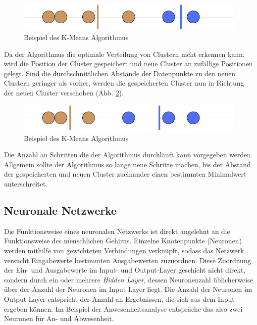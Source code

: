 \begin{figure}[h]
    \centering
    \includegraphics[width=12.0cm]{pic/KMeans_step1.png}
    \caption{Beispiel des K-Means Algorithmus}
    \label{fig:KMeans1}
\end{figure}

Da der Algorithmus die optimale Verteilung von Clustern nicht erkennen kann, wird die Position der Cluster 
gespeichert und neue Cluster an zufällige Positionen gelegt. Sind die durchschnittlichen Abstände der Datenpunkte
zu den neuen Clustern geringer als vorher, werden die gespeicherten Cluster nun in Richtung der neuen Cluster 
verschoben (Abb. \ref{fig:KMeans2}).\\

\begin{figure}[h]
    \centering
    \includegraphics[width=12.0cm]{pic/KMeans_step2.png}
    \caption{Beispiel des K-Means Algorithmus}
    \label{fig:KMeans2}
\end{figure}

Die Anzahl an Schritten die der Algorithmus durchläuft kann vorgegeben werden. Allgemein sollte der Algorithmus
so lange neue Schritte machen, bis der Abstand der gespeicherten und neuen Cluster zueinander einen bestimmten
Minimalwert unterschreitet.

\newpage
\subsection{Neuronale Netzwerke}
Die Funktionsweise eines neuronalen Netzwerks ist direkt angelehnt an die Funktionsweise des menschlichen Gehirns.
Einzelne Knotenpunkte (Neuronen) werden mithilfe von gewichteten Verbindungen verknüpft, sodass das Netzwerk versucht 
Eingabewerte bestimmten Ausgabewerten zuzuordnen. Diese Zuordnung der Ein- und Ausgabewerte im Input- und Output-Layer 
geschieht nicht direkt, sondern durch ein oder mehrere \textit{Hidden Layer}, dessen Neuronenzahl üblicherweise über 
der Anzahl der Neuronen im Input Layer liegt. Die Anzahl der Neuronen im Output-Layer entspricht der Anzahl an Ergebnissen, 
die sich aus dem Input ergeben können. Im Beispiel der Anwesenheitsanalyse entspräche das also zwei Neuronen für 
An- und Abwesenheit.

